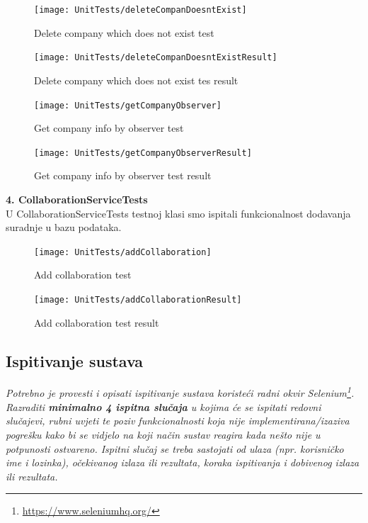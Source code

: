			\begin{figure}[H]
				\texttt{[image: UnitTests/deleteCompanDoesntExist]}
				\centering
				\caption{Delete company which does not exist test}
				\label{fig:deleteCompanyTest}
			\end{figure}
			\begin{figure}[H]
				\texttt{[image: UnitTests/deleteCompanDoesntExistResult]}
				\centering
				\caption{Delete company which does not exist tes result}
				\label{fig:deleteCompanyResult}
			\end{figure}

			\begin{figure}[H]
				\texttt{[image: UnitTests/getCompanyObserver]}
				\centering
				\caption{Get company info by observer test}
				\label{fig:getCompanyObserver}
			\end{figure}
			\begin{figure}[H]
				\texttt{[image: UnitTests/getCompanyObserverResult]}
				\centering
				\caption{Get company info by observer test result}
				\label{fig:getCompanyObserverResult}
			\end{figure}
			
			\textbf{4. CollaborationServiceTests\\}
			{U CollaborationServiceTests testnoj klasi smo ispitali funkcionalnost dodavanja suradnje u bazu podataka.}

			\begin{figure}[H]
				\texttt{[image: UnitTests/addCollaboration]}
				\centering
				\caption{Add collaboration test}
				\label{fig:addCollaboration}
			\end{figure}
			\begin{figure}[H]
				\texttt{[image: UnitTests/addCollaborationResult]}
				\centering
				\caption{Add collaboration test result}
				\label{fig:addCollaborationResult}
			\end{figure}

			\subsection{Ispitivanje sustava}
			
			 \textit{Potrebno je provesti i opisati ispitivanje sustava koristeći radni okvir Selenium\footnote{\url{https://www.seleniumhq.org/}}. Razraditi \textbf{minimalno 4 ispitna slučaja} u kojima će se ispitati redovni slučajevi, rubni uvjeti te poziv funkcionalnosti koja nije implementirana/izaziva pogrešku kako bi se vidjelo na koji način sustav reagira kada nešto nije u potpunosti ostvareno. Ispitni slučaj se treba sastojati od ulaza (npr. korisničko ime i lozinka), očekivanog izlaza ili rezultata, koraka ispitivanja i dobivenog izlaza ili rezultata.\\ }
			 
